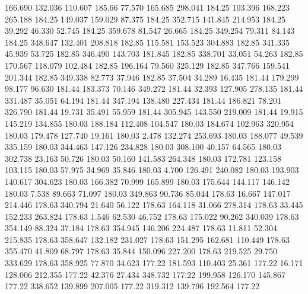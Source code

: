  166.690  132.036  110.607       185.66
  77.570  165.685  298.041       184.25
 103.396  168.223  265.188       184.25
 149.037  159.029   87.375       184.25
 352.715  141.845  214.953       184.25
  39.292   46.330   52.745       184.25
 359.678   81.547   26.665       184.25
 349.254   79.311   84.143       184.25
 348.647  132.401  208.818       182.85
 115.581  153.523  304.883       182.85
 341.335   45.939   53.725       182.85
 346.490  143.703  181.845       182.85
 338.701   33.051   54.263       182.85
 170.567  118.079  102.484       182.85
 196.164   79.560  325.129       182.85
 347.766  159.541  201.344       182.85
 349.338   82.773   37.946       182.85
  37.504   34.289   16.435       181.44
 179.299   98.177   96.630       181.44
 183.373   70.146  349.272       181.44
  32.393  127.905  278.135       181.44
 331.487   35.051   64.194       181.44
 347.194  138.480  227.434       181.44
 186.821   78.201  326.790       181.44
  19.731   35.491   55.959       181.44
 305.945  143.550  219.009       181.44
  19.915  145.219  134.855       180.03
 188.184  112.408  104.547       180.03
 184.674  102.963  320.954       180.03
 179.478  127.740   19.161       180.03
   2.478  132.274  253.693       180.03
 188.077   49.539  335.159       180.03
 344.463  147.126  234.828       180.03
 308.100   40.157   64.565       180.03
 302.738   23.163   50.726       180.03
  50.160  141.583  264.348       180.03
 172.781  123.158  103.115       180.03
  57.975   34.969   35.846       180.03
   4.700  126.491  240.082       180.03
 193.903  140.617  304.623       180.03
 166.382   70.999  165.899       180.03
 175.644  144.117  146.142       180.03
   7.538   89.663   71.097       180.03
 349.863   90.736   85.044       178.63
  16.667  147.017  214.446       178.63
 340.794   21.640   56.122       178.63
 164.118   31.066  278.314       178.63
  33.445  152.233  263.824       178.63
   1.546   62.530   46.752       178.63
 175.022   90.262  340.039       178.63
 354.149   88.324   37.184       178.63
 354.945  146.206  224.487       178.63
  11.811   52.304  215.835       178.63
 358.647  132.182  231.027       178.63
 151.295  162.681  110.449       178.63
 355.470   41.809   68.797       178.63
  35.844  150.096  227.200       178.63
 219.525   29.750  333.629       178.63
 358.925   77.870   34.623       177.22
 181.593  110.403   25.361       177.22
  16.171  128.006  212.355       177.22
  42.376   27.434  348.732       177.22
 199.958  126.170  145.867       177.22
 338.652  139.899  207.005       177.22
 319.312  139.796  192.564       177.22

